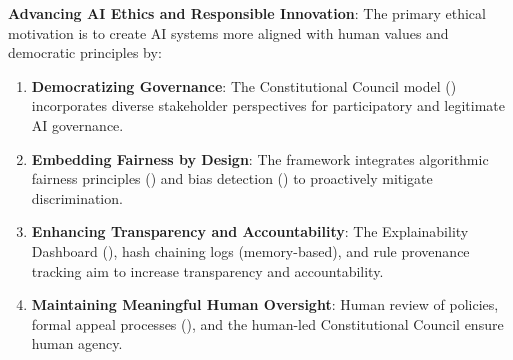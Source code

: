 \documentclass[manuscript,screen,9pt]{acmart}
\begin{document}
\begin{table}[!htb]
\textbf{Advancing AI Ethics and Responsible Innovation}:
The primary ethical motivation is to create AI systems more aligned with human values and democratic principles by:
\begin{enumerate}[leftmargin=*,itemsep=1pt,parsep=1pt]
    \item \textbf{Democratizing Governance}: The Constitutional Council model () incorporates diverse stakeholder perspectives for participatory and legitimate AI governance.
    \item \textbf{Embedding Fairness by Design}: The framework integrates algorithmic fairness principles () and bias detection () to proactively mitigate discrimination.
    \item \textbf{Enhancing Transparency and Accountability}: The Explainability Dashboard (), hash chaining logs (memory-based), and rule provenance tracking aim to increase transparency and accountability.
    \item \textbf{Maintaining Meaningful Human Oversight}: Human review of policies, formal appeal processes (), and the human-led Constitutional Council ensure human agency.
\end{enumerate}


\end{table}
\end{document}
